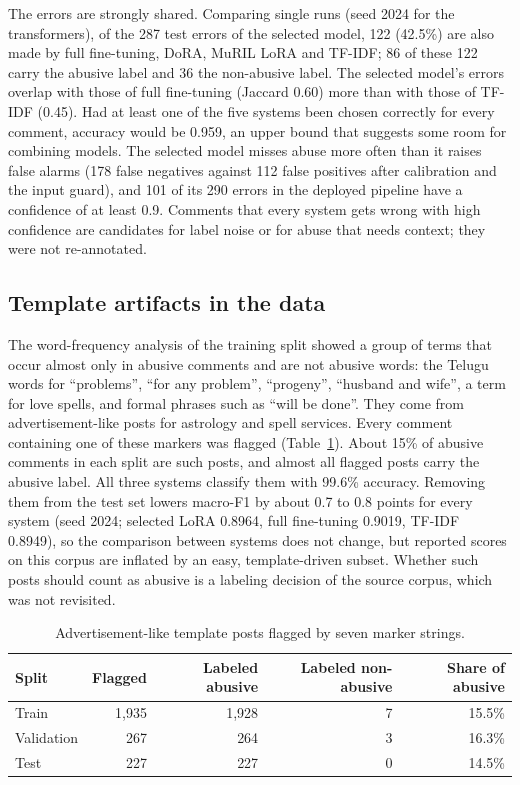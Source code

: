 \documentclass[conference]{IEEEtran}
\begin{document}
The errors are strongly shared. Comparing single runs (seed 2024 for the transformers), of the 287 test errors of the selected model, 122 (42.5\%) are also made by full fine-tuning, DoRA, MuRIL LoRA and TF-IDF; 86 of these 122 carry the abusive label and 36 the non-abusive label. The selected model's errors overlap with those of full fine-tuning (Jaccard 0.60) more than with those of TF-IDF (0.45). Had at least one of the five systems been chosen correctly for every comment, accuracy would be 0.959, an upper bound that suggests some room for combining models. The selected model misses abuse more often than it raises false alarms (178 false negatives against 112 false positives after calibration and the input guard), and 101 of its 290 errors in the deployed pipeline have a confidence of at least 0.9. Comments that every system gets wrong with high confidence are candidates for label noise or for abuse that needs context; they were not re-annotated.

\subsection{Template artifacts in the data}
The word-frequency analysis of the training split showed a group of terms that occur almost only in abusive comments and are not abusive words: the Telugu words for ``problems'', ``for any problem'', ``progeny'', ``husband and wife'', a term for love spells, and formal phrases such as ``will be done''. They come from advertisement-like posts for astrology and spell services. Every comment containing one of these markers was flagged (Table~\ref{tab:template}). About 15\% of abusive comments in each split are such posts, and almost all flagged posts carry the abusive label. All three systems classify them with 99.6\% accuracy. Removing them from the test set lowers macro-F1 by about 0.7 to 0.8 points for every system (seed 2024; selected LoRA 0.8964, full fine-tuning 0.9019, TF-IDF 0.8949), so the comparison between systems does not change, but reported scores on this corpus are inflated by an easy, template-driven subset. Whether such posts should count as abusive is a labeling decision of the source corpus, which was not revisited.

\begin{table}[t]
\caption{Advertisement-like template posts flagged by seven marker strings.}
\label{tab:template}
\centering
\footnotesize
\setlength{\tabcolsep}{4pt}
\begin{tabular}{lrrrr}
\toprule
Split & Flagged & Labeled abusive & Labeled non-abusive & Share of abusive \\
\midrule
Train & 1,935 & 1,928 & 7 & 15.5\% \\
Validation & 267 & 264 & 3 & 16.3\% \\
Test & 227 & 227 & 0 & 14.5\% \\
\bottomrule
\end{tabular}
\end{table}
\end{document}

